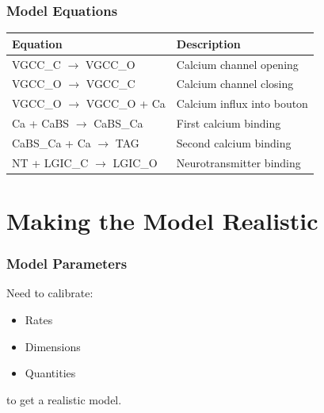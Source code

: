 \documentclass{beamer}
\begin{document}
\frame
{
\frametitle{Model Equations}
\begin{table}[H]
\begin{tabular}{ll}
Equation & Description \\ \hline
VGCC\_C $\to$ VGCC\_O & Calcium channel opening \\
VGCC\_O $\to$ VGCC\_C & Calcium channel closing \\
VGCC\_O $\to$ VGCC\_O + Ca & Calcium influx into bouton \\
Ca + CaBS $\to$ CaBS\_Ca & First calcium binding \\ 
CaBS\_Ca + Ca $\to$ TAG & Second calcium binding \\
NT + LGIC\_C $\to$ LGIC\_O& Neurotransmitter binding \\
\end{tabular} 
\end{table}

}

\section{Making the Model Realistic}
\frame
{
    \frametitle{Model Parameters}
    Need to calibrate:
    \begin{itemize}
        \item Rates
        \item Dimensions
        \item Quantities
    \end{itemize}
    to get a realistic model.
}
\end{document}

